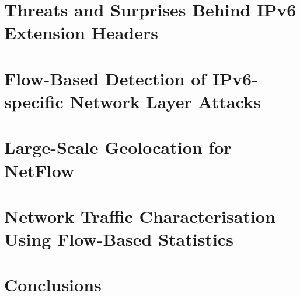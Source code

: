 \section{Threats and Surprises Behind IPv6 Extension Headers}

\section{Flow-Based Detection of IPv6-specific Network Layer Attacks}

\section{Large-Scale Geolocation for NetFlow}

\section{Network Traffic Characterisation Using Flow-Based Statistics}


\section{Conclusions}\label{sec:use-cases-conclusions}